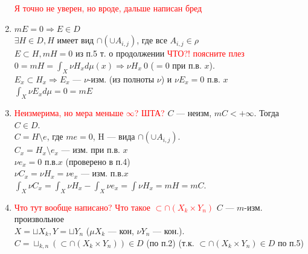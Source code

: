 \documentclass[paper=a4, fontsize=17pt]{article}
\begin{document}
\begin{enumerate}
			\textcolor{red}{Я точно не уверен, но вроде, дальше написан бред}
			\item
				$m E = 0 \Rightarrow E \in D$\\
				$\exists H \in D, H$ имеет вид $\cap(\cup A_{i, j})$, где все $A_{i,j} \in \rho$ \\
				$E \subset H , m H = 0$ из п.5 т. о продолжении \textcolor{red}{ЧТО?! поясните плез}\\
				$0 = m H = \int_X\nu H_x d\mu(x) \Rightarrow \nu H_x ~ 0$ ($ = 0$ при п.в. $x$).\\
				$E_x \subset H_x \Rightarrow E_x$ --- $\nu$-изм. (из полноты $\nu$) и $\nu E_x = 0$ п.в. $x$\\
				$\int_X \nu E_x d\mu = 0 = m E$
			\item
				\textcolor{red}{Неизмерима, но мера меньше $\infty$? ШТА?}
				$C$ --- неизм, $m C < +\infty$. Тогда $C \in D$.\\
				$C = H \setminus e$, где $m e = 0$, H --- вида $\cap(\cup A_{i, j})$.\\
				$C_x = H_x \setminus e_x$ --- изм. при п.в. $x$\\
				$\nu e_x = 0$ п.в.$x$ (проверено в п.4)\\
				$\nu C_x = \nu H_x = \nu e_x$ --- изм. п.в.$x$\\
				$\int_X\nu C_x = \int_X\nu H_x - \int_X\nu e_x = \int\nu H_x = m H = m C$.
			\item
				\textcolor{red}{Что тут вообще написано? Что такое $\subset \cap(X_k \times Y_n)$}
				$C$ --- $m$-изм. произвольное\\
				$X = \sqcup X_k, Y = \sqcup Y_n$ ($\mu X_k$ --- кон, $\nu Y_n$ --- кон.).\\
				$C = \sqcup_{k,n}(\subset \cap(X_k \times Y_n)) \in D$ (по п.2) (т.к. $\subset \cap(X_k \times Y_n) \in D$ по п.5)
		\end{enumerate}
\end{document}
